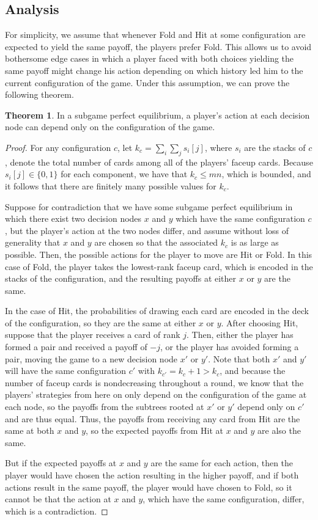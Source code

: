 \documentclass{article}
\theoremstyle{definition}
\newcounter{a}
\newtheorem{theorem}[a]{Theorem}
\begin{document}
\subsection{Analysis}

For simplicity, we assume that whenever Fold and Hit at some configuration are expected to yield the same payoff, the players prefer Fold. This allows us to avoid bothersome edge cases in which a player faced with both choices yielding the same payoff might change his action depending on which history led him to the current configuration of the game. Under this assumption, we can prove the following theorem.

\begin{theorem}
In a subgame perfect equilibrium, a player's action at each decision node can depend only on the configuration of the game.
\begin{proof}
For any configuration $c$, let $k_c = \sum_i \sum_j s_i [j]$, where $s_i$ are the stacks of $c$, denote the total number of cards among all of the players' faceup cards. Because $s_i [j] \in \{0,1\}$ for each component, we have that $k_c \le mn$, which is bounded, and it follows that there are finitely many possible values for $k_c$.

Suppose for contradiction that we have some subgame perfect equilibrium in which there exist two decision nodes $x$ and $y$ which have the same configuration $c$, but the player's action at the two nodes differ, and assume without loss of generality that $x$ and $y$ are chosen so that the associated $k_c$ is as large as possible. Then, the possible actions for the player to move are Hit or Fold. In this case of Fold, the player takes the lowest-rank faceup card, which is encoded in the stacks of the configuration, and the resulting payoffs at either $x$ or $y$ are the same. 

In the case of Hit, the probabilities of drawing each card are encoded in the deck of the configuration, so they are the same at either $x$ or $y$. After choosing Hit, suppose that the player receives a card of rank $j$. Then, either the player has formed a pair and received a payoff of $-j$, or the player has avoided forming a pair, moving the game to a new decision node $x'$ or $y'$. Note that both $x'$ and $y'$ will have the same configuration $c'$ with $k_{c'} = k_c  + 1 >  k_c$, and because the number of faceup cards is nondecreasing throughout a round, we know that the players' strategies from here on only depend on the configuration of the game at each node, so the payoffs from the subtrees rooted at $x'$ or $y'$ depend only on $c'$ and are thus equal. Thus, the payoffs from receiving any card from Hit are the same at both $x$ and $y$, so the expected payoffs from Hit at $x$ and $y$ are also the same.

But if the expected payoffs at $x$ and $y$ are the same for each action, then the player would have chosen the action resulting in the higher payoff, and if both actions result in the same payoff, the player would have chosen to Fold, so it cannot be that the action at $x$ and $y$, which have the same configuration, differ, which is a contradiction.
\end{proof}
\label{proof:2playermarkov}
\end{theorem}
\end{document}
